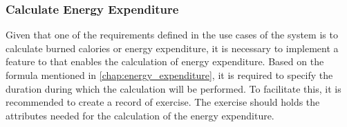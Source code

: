 \subsubsection{Calculate Energy Expenditure}
Given that one of the requirements defined in the use cases of the system is to calculate burned calories or energy expenditure, it is necessary to implement a feature to that enables the calculation of energy expenditure. 
Based on the formula mentioned in \autoref{chap:energy_expenditure}, it is required to specify the duration during which the calculation will be performed. To facilitate this, it is recommended to create a record of exercise. The exercise should holds the attributes needed for the calculation of the energy expenditure.



